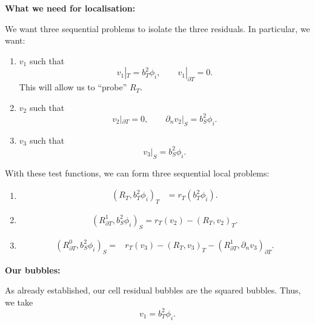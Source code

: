 \documentclass[12pt,a4paper]{article}
\newcommand{\dn}{\partial_n}
\newcommand{\Rone}{R_{\partial T}^{1}}
\newcommand{\Rzero}{R_{\partial T}^{0}}
\begin{document}
\textbf{What we need for localisation:}

We want three sequential problems to isolate the three residuals. In particular, we want:
\begin{enumerate}[label=(\arabic*)]
    \item $v_1$ such that
    \begin{equation}
       v_1|_T=b_T^2\phi_i,
       \qquad v_1|_{\partial T}=0.
    \end{equation}
    This will allow us to ``probe'' $R_T$.

    \item $v_2$ such that
    \begin{equation}
        v_2|_{\partial T}=0,
        \qquad \dn v_2|_S=b_S^2\phi_i.
    \end{equation}

    \item $v_3$ such that
    \begin{equation}
        v_3|_S=b_S^2\phi_i.
    \end{equation}
\end{enumerate}

With these test functions, we can form three sequential local problems:
\begin{enumerate}[label=(\arabic*)]
    \item
    \begin{align}
         (R_T,b_T^2\phi_i)_T
           &=r_T(b_T^2\phi_i).
    \end{align}

    \item
    \begin{equation}
        (\Rone,b_S^2\phi_i)_S
        =r_T(v_2)-(R_T,v_2)_T.
    \end{equation}

    \item
    \begin{equation}
    \begin{aligned}
        (\Rzero,b_S^2\phi_i)_S
          ={}&r_T(v_3)-(R_T,v_3)_T
             -(\Rone,\dn v_3)_{\partial T}.
    \end{aligned}
    \end{equation}
\end{enumerate}


\textbf{Our bubbles:}

As already established, our cell residual bubbles are the squared bubbles. Thus, we take
\begin{equation}
    v_1=b_T^2\phi_i.
\end{equation}
\end{document}

